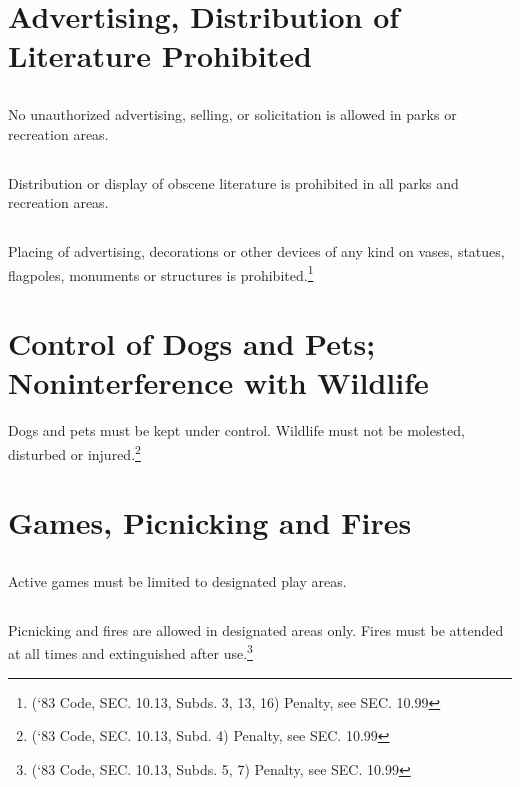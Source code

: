\section{Advertising, Distribution of Literature Prohibited}
\subsection{}
No unauthorized advertising, selling, or solicitation is allowed in parks or recreation areas.
\subsection{}
Distribution or display of obscene literature is prohibited in all parks and recreation areas.
\subsection{}
Placing of advertising, decorations or other devices of any kind on vases, statues, flagpoles, monuments or structures is prohibited.\footnote{(‘83 Code, SEC. 10.13, Subds. 3, 13, 16)  Penalty, see SEC. 10.99}

\section{Control of Dogs and Pets; Noninterference with Wildlife}
Dogs and pets must be kept under control.  Wildlife must not be molested, disturbed or injured.\footnote{(‘83 Code, SEC. 10.13, Subd. 4)  Penalty, see SEC. 10.99}

\section{Games, Picnicking and Fires}
\subsection{}
Active games must be limited to designated play areas.
\subsection{}
Picnicking and fires are allowed in designated areas only.  Fires must be attended at all times and extinguished after use.\footnote{(‘83 Code, SEC. 10.13, Subds. 5, 7)  Penalty, see SEC. 10.99}

